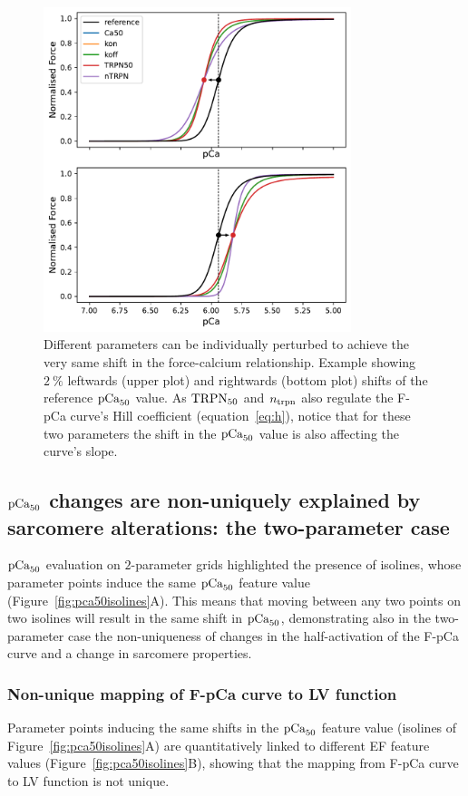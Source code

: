 \begin{figure}[h!]
    \myfloatalign
    \includegraphics[width=0.8\textwidth]{figures/chapter08/Fig4.pdf}
    \caption{Different parameters can be individually perturbed to achieve the very same shift in the force-calcium relationship. Example showing $\SI{2}{\percent}$ leftwards (upper plot) and rightwards (bottom plot) shifts of the reference $\textrm{pCa}_{50}$ value. As $\textrm{TRPN}_{50}$ and $n_{\textrm{trpn}}$ also regulate the F-pCa curve's Hill coefficient (equation~\eqref{eq:h}), notice that for these two parameters the shift in the $\textrm{pCa}_{50}$ value is also affecting the curve's slope.}
    \label{fig:2perclwrwshift}
\end{figure}


%
%
%
\subsection{$\textrm{pCa}_{50}$ changes are non-uniquely explained by sarcomere alterations: the two-parameter case}\label{sec:changespCa50result2}
$\textrm{pCa}_{50}$ evaluation on $2$-parameter grids highlighted the presence of isolines, whose parameter points induce the same $\textrm{pCa}_{50}$ feature value (Figure~\ref{fig:pca50isolines}A). This means that moving between any two points on two isolines will result in the same shift in $\textrm{pCa}_{50}$, demonstrating also in the two-parameter case the non-uniqueness of changes in the half-activation of the F-pCa curve and a change in sarcomere properties.


%
%
%
\subsubsection{Non-unique mapping of F-pCa curve to LV function}\label{sec:fpcatolvnonuniquemapping}
Parameter points inducing the same shifts in the $\textrm{pCa}_{50}$ feature value (isolines of Figure~\ref{fig:pca50isolines}A) are quantitatively linked to different EF feature values (Figure~\ref{fig:pca50isolines}B), showing that the mapping from F-pCa curve to LV function is not unique.


